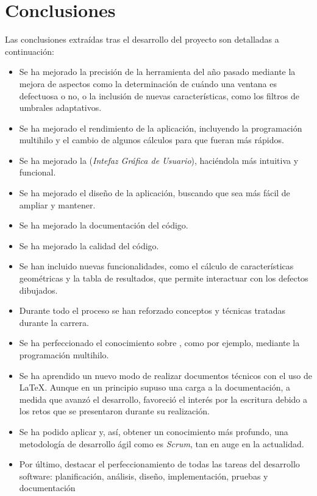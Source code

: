 \section{Conclusiones}
Las conclusiones extraídas tras el desarrollo del proyecto son detalladas a continuación:
\begin{itemize}
\item Se ha mejorado la precisión de la herramienta del año pasado mediante la mejora de aspectos como la determinación de cuándo una ventana es defectuosa o no, o la inclusión de nuevas características, como los filtros de umbrales adaptativos.
\item Se ha mejorado el rendimiento de la aplicación, incluyendo la programación multihilo y el cambio de algunos cálculos para que fueran más rápidos.
 \item Se ha mejorado la \gui{} (\textit{Intefaz Gráfica de Usuario}), haciéndola más intuitiva y funcional.
 \item Se ha mejorado el diseño de la aplicación, buscando que sea más fácil de ampliar y mantener.
 \item Se ha mejorado la documentación del código.
 \item Se ha mejorado la calidad del código.
 \item Se han incluido nuevas funcionalidades, como el cálculo de características geométricas y la tabla de resultados, que permite interactuar con los defectos dibujados.
 \item Durante todo el proceso se han reforzado conceptos y técnicas tratadas durante la carrera.
 \item Se ha perfeccionado el conocimiento sobre \java{}, como por ejemplo, mediante la programación multihilo.
 \item Se ha aprendido un nuevo modo de realizar documentos técnicos con el uso de \LaTeX{}. Aunque en un principio supuso una carga a la documentación, a medida que avanzó el desarrollo, favoreció el interés por la escritura debido a los retos que se presentaron durante su realización.
 \item Se ha podido aplicar y, así, obtener un conocimiento más profundo, una metodología de desarrollo ágil como es \textit{Scrum}, tan en auge en la actualidad.
 \item Por último, destacar el perfeccionamiento de todas las tareas del desarrollo software: planificación, análisis, diseño, implementación, pruebas y documentación
\end{itemize}

